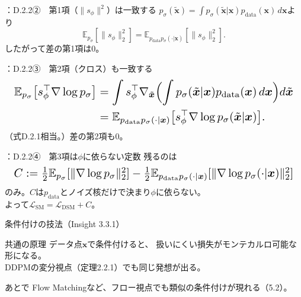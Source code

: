 \assuppl
\begin{frame}{\supplmark：D.2.2②　第1項（$\|s_\phi\|^2$）は一致する}
    $p_\sigma(\tilde{\bm{x}})=\int p_\sigma(\tilde{\bm{x}}|\bm{x})p_{\mathrm{data}}(\bm{x})\,d\bm{x}$より
    \[
        \mathbb{E}_{p_\sigma}[\|s_\phi\|_2^2]
        =
        \mathbb{E}_{p_{\mathrm{data}}p_\sigma(\cdot|\bm{x})}[\|s_\phi\|_2^2].
    \]
    したがって差の第1項は$0$。
\end{frame}
\assuppl
\begin{frame}{\supplmark：D.2.2③　第2項（クロス）も一致する}
    \[
        \resizebox{0.98\textwidth}{!}{$
        \begin{aligned}
        \mathbb{E}_{p_\sigma}
        \bigl[s_\phi^{\top}\nabla\log p_\sigma\bigr]
        &=
        \int s_\phi^{\top}\nabla_{\tilde{\bm{x}}}
        \Bigl(
        \int p_\sigma(\tilde{\bm{x}}|\bm{x})p_{\mathrm{data}}(\bm{x})\,d\bm{x}
        \Bigr)
        d\tilde{\bm{x}}\\
        &=
        \mathbb{E}_{p_{\mathrm{data}}p_\sigma(\cdot|\bm{x})}
        \bigl[s_\phi^{\top}\nabla\log p_\sigma(\tilde{\bm{x}}|\bm{x})\bigr].
        \end{aligned}
        $}
    \]
    （式D.2.1相当。）差の第2項も$0$。
\end{frame}
\assuppl
\begin{frame}{\supplmark：D.2.2④　第3項は$\phi$に依らない定数}
    残るのは
    \[
        \resizebox{0.98\textwidth}{!}{$
        C
        :=
        \tfrac12\mathbb{E}_{p_\sigma}[\|\nabla\log p_\sigma\|_2^2]
        -
        \tfrac12\mathbb{E}_{p_{\mathrm{data}}p_\sigma(\cdot|\bm{x})}
        [\|\nabla\log p_\sigma(\cdot|\bm{x})\|_2^2]
        $}
    \]
    のみ。$C$は$p_{\mathrm{data}}$とノイズ核だけで決まり$\phi$に依らない。\\
    よって$\mathcal{L}_{\mathrm{SM}}=\mathcal{L}_{\mathrm{DSM}}+C$。
\end{frame}
\assuppl
\begin{frame}{条件付けの技法（Insight 3.3.1）}
    \begin{exampleblock}{共通の原理}
        データ点$\bm{x}$で条件付けると、
        扱いにくい損失がモンテカルロ可能な形になる。\\
        DDPMの変分視点（定理2.2.1）でも同じ発想が出る。
    \end{exampleblock}
    \begin{exampleblock}{あとで}
        Flow Matchingなど、フロー視点でも類似の条件付けが現れる（5.2）。
    \end{exampleblock}
\end{frame}
